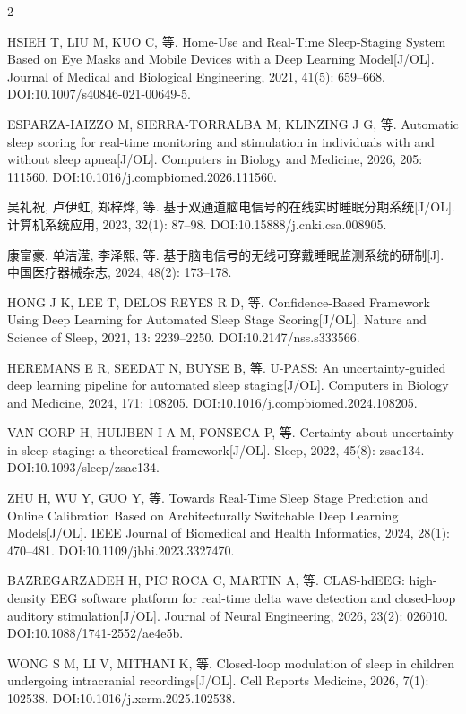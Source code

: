 \documentclass[UTF8,zihao=5,fontset=none]{ctexart}
\begin{document}
\begin{multicols}{2}
{\makebox[25.2pt][l]{[56]}HSIEH T, LIU M, KUO C, 等. Home-Use and Real-Time Sleep-Staging System Based on Eye Masks and Mobile Devices with a Deep Learning Model[J/OL]. Journal of Medical and Biological Engineering, 2021, 41(5): 659--668. DOI:10.1007/s40846-021-00649-5.\par
\makebox[25.2pt][l]{[57]}ESPARZA-IAIZZO M, SIERRA-TORRALBA M, KLINZING J G, 等. Automatic sleep scoring for real-time monitoring and stimulation in individuals with and without sleep apnea[J/OL]. Computers in Biology and Medicine, 2026, 205: 111560. DOI:10.1016/j.compbiomed.2026.111560.\par
\makebox[25.2pt][l]{[58]}吴礼祝, 卢伊虹, 郑梓烨, 等. 基于双通道脑电信号的在线实时睡眠分期系统[J/OL]. 计算机系统应用, 2023, 32(1): 87--98. DOI:10.15888/j.cnki.csa.008905.\par
\makebox[25.2pt][l]{[59]}康富豪, 单洁滢, 李泽熙, 等. 基于脑电信号的无线可穿戴睡眠监测系统的研制[J]. 中国医疗器械杂志, 2024, 48(2): 173--178.\par
\makebox[25.2pt][l]{[60]}HONG J K, LEE T, DELOS REYES R D, 等. Confidence-Based Framework Using Deep Learning for Automated Sleep Stage Scoring[J/OL]. Nature and Science of Sleep, 2021, 13: 2239--2250. DOI:10.2147/nss.s333566.\par
\makebox[25.2pt][l]{[61]}HEREMANS E R, SEEDAT N, BUYSE B, 等. U-PASS: An uncertainty-guided deep learning pipeline for automated sleep staging[J/OL]. Computers in Biology and Medicine, 2024, 171: 108205. DOI:10.1016/j.compbiomed.2024.108205.\par
\makebox[25.2pt][l]{[62]}VAN GORP H, HUIJBEN I A M, FONSECA P, 等. Certainty about uncertainty in sleep staging: a theoretical framework[J/OL]. Sleep, 2022, 45(8): zsac134. DOI:10.1093/sleep/zsac134.\par
\makebox[25.2pt][l]{[63]}ZHU H, WU Y, GUO Y, 等. Towards Real-Time Sleep Stage Prediction and Online Calibration Based on Architecturally Switchable Deep Learning Models[J/OL]. IEEE Journal of Biomedical and Health Informatics, 2024, 28(1): 470--481. DOI:10.1109/jbhi.2023.3327470.\par
\makebox[25.2pt][l]{[64]}BAZREGARZADEH H, PIC ROCA C, MARTIN A, 等. CLAS-hdEEG: high-density EEG software platform for real-time delta wave detection and closed-loop auditory stimulation[J/OL]. Journal of Neural Engineering, 2026, 23(2): 026010. DOI:10.1088/1741-2552/ae4e5b.\par
\makebox[25.2pt][l]{[65]}WONG S M, LI V, MITHANI K, 等. Closed-loop modulation of sleep in children undergoing intracranial recordings[J/OL]. Cell Reports Medicine, 2026, 7(1): 102538. DOI:10.1016/j.xcrm.2025.102538.\par
}
\end{multicols}
\end{document}
